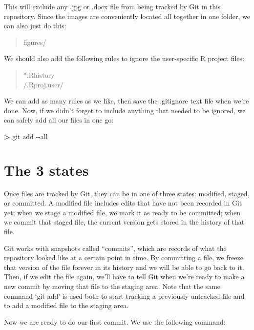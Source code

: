 \documentclass[
]{book}
\newenvironment{Shaded}{\begin{snugshade}}{\end{snugshade}}
\newcommand{\AttributeTok}[1]{\textcolor[rgb]{0.13,0.29,0.53}{#1}}
\newcommand{\ExtensionTok}[1]{#1}
\newcommand{\NormalTok}[1]{#1}
\newcommand{\OperatorTok}[1]{\textcolor[rgb]{0.81,0.36,0.00}{\textbf{#1}}}
\begin{document}
This will exclude any .jpg or .docx file from being tracked by Git in this repository. Since the images are conveniently located all together in one folder, we can also just do this:

\begin{quote}
figures/
\end{quote}

We should also add the following rules to ignore the user-specific R project files:

\begin{quote}
*.Rhistory\\
/.Rproj.user/
\end{quote}

We can add as many rules as we like, then save the .gitignore text file when we're done. Now, if we didn't forget to include anything that needed to be ignored, we can safely add all our files in one go:

\begin{Shaded}
\begin{Highlighting}[]
\OperatorTok{\textgreater{}}\NormalTok{ git }\ExtensionTok{add} \AttributeTok{{-}{-}all}
\end{Highlighting}
\end{Shaded}

\hypertarget{the-3-states}{%
\section{The 3 states}\label{the-3-states}}

Once files are tracked by Git, they can be in one of three states: modified, staged, or committed. A modified file includes edits that have not been recorded in Git yet; when we stage a modified file, we mark it as ready to be committed; when we commit that staged file, the current version gets stored in the history of that file.

Git works with snapshots called ``commits'', which are records of what the repository looked like at a certain point in time. By committing a file, we freeze that version of the file forever in its history and we will be able to go back to it. Then, if we edit the file again, we'll have to tell Git when we're ready to make a new commit by moving that file to the staging area. Note that the same command `git add' is used both to start tracking a previously untracked file and to add a modified file to the staging area.

Now we are ready to do our first commit. We use the following command:
\end{document}
